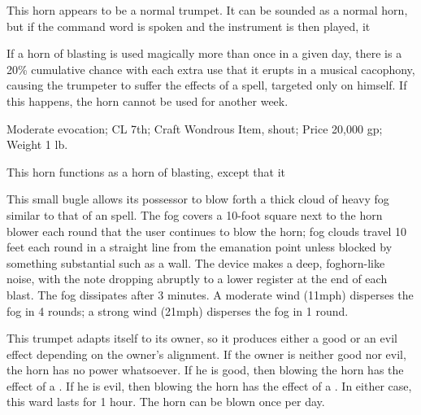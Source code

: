 {

 This horn appears to be a normal trumpet. It can be sounded as a normal horn, but if the command word is spoken and the instrument is then played, it 

If a horn of blasting is used magically more than once in a given day, there is a 20\% cumulative chance with each extra use that it erupts in a musical cacophony, causing the trumpeter to suffer the effects of a  spell, targeted only on himself. If this happens, the horn cannot be used for another week.

Moderate evocation; CL 7th; Craft Wondrous Item, shout; Price 20,000 gp; Weight 1 lb.

 This horn functions as a horn of blasting, except that it 


 This small bugle allows its possessor to blow forth a thick cloud of heavy fog similar to that of an  spell. The fog covers a 10-foot square next to the horn blower each round that the user continues to blow the horn; fog clouds travel 10 feet each round in a straight line from the emanation point unless blocked by something substantial such as a wall. The device makes a deep, foghorn-like noise, with the note dropping abruptly to a lower register at the end of each blast. The fog dissipates after 3 minutes. A moderate wind (11\add mph) disperses the fog in 4 rounds; a strong wind (21\add mph) disperses the fog in 1 round.


 This trumpet adapts itself to its owner, so it produces either a good or an evil effect depending on the owner's alignment. If the owner is neither good nor evil, the horn has no power whatsoever. If he is good, then blowing the horn has the effect of a . If he is evil, then blowing the horn has the effect of a . In either case, this ward lasts for 1 hour. The horn can be blown once per day.

}
